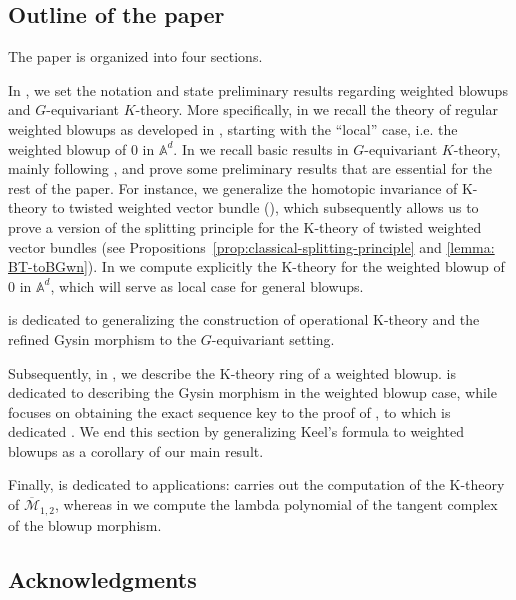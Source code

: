 \documentclass[12pt]{amsart}
\newcommand{\bA}{\mathbb{A}}
\newcommand{\cM}{\mathcal{M}}
\theoremstyle{definition}
\begin{document}
\subsection{Outline of the paper}

The paper is organized into four sections. 

In , we set the notation and state preliminary results regarding weighted blowups and $G$-equivariant $K$-theory. More specifically, in  we recall the theory of regular weighted blowups as developed in \cite{quek-rydh-weighted-blowup}, starting
with the ``local'' case, i.e.\! the weighted blowup of $0$ in $\bA^d$. In  we recall basic results in $G$-equivariant $K$-theory, mainly following \cite{Thomason-equivariantKtheory}, and prove some preliminary results that are essential for the rest of the paper. For instance, we generalize the homotopic invariance of K-theory to twisted weighted vector bundle (), which subsequently allows us to prove a version of the splitting principle for the K-theory of twisted weighted vector bundles (see Propositions~\ref{prop:classical-splitting-principle} and \ref{lemma: BT-toBGwn}). In  we compute explicitly the K-theory for the weighted blowup of $0$ in $\mathbb{A}^d$, which will serve as local case for general blowups.

 is dedicated to generalizing the construction of operational K-theory and the refined Gysin morphism to the $G$-equivariant setting.

Subsequently, in , we describe the K-theory ring of a weighted blowup.  is dedicated to describing the Gysin morphism in the weighted blowup case, while  focuses on obtaining the exact sequence key to the proof of , to which is dedicated .
We end this section by generalizing Keel's formula to weighted blowups as a corollary of our main result. 

Finally,  is dedicated to applications:  carries out the computation of the K-theory of $\overline{\cM}_{1,2}$, whereas in  we compute the lambda polynomial of the tangent complex of the blowup morphism.

\subsection{Acknowledgments}
\end{document}
